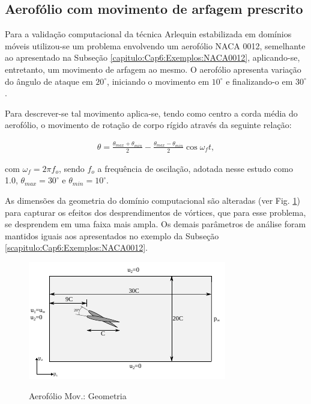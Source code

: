 \documentclass[tese_patricia]{subfiles}
\begin{document}
\subsection{Aerofólio com movimento de arfagem prescrito}


Para a validação computacional da técnica Arlequin estabilizada em domínios móveis  utilizou-se um problema envolvendo um aerofólio NACA 0012, semelhante ao apresentado na Subseção \ref{capitulo:Cap6:Exemplos:NACA0012}, aplicando-se, entretanto, um movimento de arfagem ao mesmo. O aerofólio apresenta variação do ângulo de ataque em $20^{\circ}$, iniciando o movimento em $10^{\circ}$ e finalizando-o em $30^{\circ}$. 

Para descrever-se tal movimento aplica-se, tendo como centro a corda média do aerofólio, o movimento de rotação de corpo rígido através da seguinte relação:

\begin{align}
	\theta = \frac{\theta_{max}+\theta_{min}}{2} - \frac{\theta_{max}-\theta_{min}}{2}\cos{\omega_{f}t} ,
\end{align}

\noindent com $\omega_{f} = 2\pi f_{o}$, sendo $f_{o}$ a frequência de oscilação, adotada nesse estudo como 1.0, $\theta_{max} = 30^{\circ}$ e $\theta_{min} = 10^{\circ}$.

As dimensões da geometria do domínio computacional são alteradas (ver Fig. \ref{fig:aerofolioMov_geometria}) para capturar os efeitos dos desprendimentos de vórtices, que para esse problema, se desprendem em uma faixa mais ampla. Os demais parâmetros de análise foram mantidos iguais aos apresentados no exemplo da Subseção \ref{scapitulo:Cap6:Exemplos:NACA0012}. 

\begin{figure}[htb!]
	\centering 
	{\includegraphics[scale=2.0,trim=0cm 0cm 0cm 0cm, clip=true]{Imagens/Cap6/aerofolioMov_geometria.pdf}}	
	\caption{Aerofólio Mov.: Geometria}
	\label{fig:aerofolioMov_geometria}
\end{figure}
\end{document}
